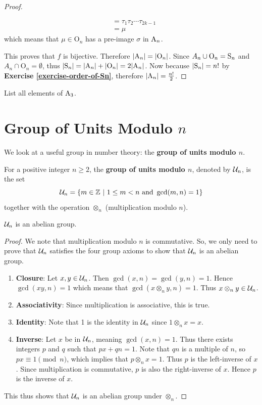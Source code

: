 \begin{proof}
\begin{itemize}
\begin{align*}
            &= \tau_1\tau_2\cdots\tau_{2k-1}\\
            &= \mu
        \end{align*}
        which means that $\mu \in \mathrm{O}_n$ has a pre-image $\sigma$ in $\mathrm{A}_{n}$.
    \end{itemize}
    This proves that $f$ is bijective. Therefore $|\mathrm{A}_{n}| = |\mathrm{O}_n|$. Since $A_n \cup \mathrm{O}_n = \mathrm{S}_{n}$ and $A_n \cap \mathrm{O}_n = \emptyset$, thus $|\mathrm{S}_{n}| = |\mathrm{A}_{n}| + |\mathrm{O}_n| = 2|\mathrm{A}_{n}|$. Now because $|\mathrm{S}_{n}| = n!$ by \textbf{Exercise \ref{exercise-order-of-Sn}}, therefore $|\mathrm{A}_{n}| = \frac{n!}2$.
\end{proof}

\begin{exercise}
    List all elements of $\mathrm{A}_{3}$.
\end{exercise}

\newpage

\section{Group of Units Modulo \texorpdfstring{$n$}{n}}
We look at a useful group in number theory: the \textbf{group of units modulo $n$}.

\begin{definition}
    For a positive integer $n \geq 2$, the \textbf{group of units modulo $n$}, denoted by $\mathcal{U}_{n}$, is the set
    \[
        \mathcal{U}_{n} = \{m \in \mathbb{Z} \ | \ 1 \leq m < n \text{ and } \gcd(m, n) = 1\}
    \]
    together with the operation $\otimes_n$ (multiplication modulo $n$).
\end{definition}
\begin{proposition}
    $\mathcal{U}_{n}$ is an abelian group.
\end{proposition}
\begin{proof}
    We note that multiplication modulo $n$ is commutative. So, we only need to prove that $\mathcal{U}_{n}$ satisfies the four group axioms to show that $\mathcal{U}_{n}$ is an abelian group.
    \begin{enumerate}
        \item \textbf{Closure}: Let $x, y \in \mathcal{U}_{n}$. Then $\gcd(x, n) = \gcd(y, n) = 1$. Hence $\gcd(xy, n) = 1$ which means that $\gcd(x\otimes_ny,n)=1$. Thus $x\otimes_ny \in \mathcal{U}_{n}$.
        \item \textbf{Associativity}: Since multiplication is associative, this is true.
        \item \textbf{Identity}: Note that 1 is the identity in $\mathcal{U}_{n}$ since $1 \otimes_n x = x$.
        \item \textbf{Inverse}: Let $x$ be in $\mathcal{U}_{n}$, meaning $\gcd(x, n) = 1$. Thus there exists integers $p$ and $q$ such that $px + qn = 1$. Note that $qn$ is a multiple of $n$, so $px \equiv 1 \pmod{n}$, which implies that $p \otimes_n x = 1$. Thus $p$ is the left-inverse of $x$. Since multiplication is commutative, $p$ is also the right-inverse of $x$. Hence $p$ is the inverse of $x$.
    \end{enumerate}
    This thus shows that $\mathcal{U}_{n}$ is an abelian group under $\otimes_n$.
\end{proof}

